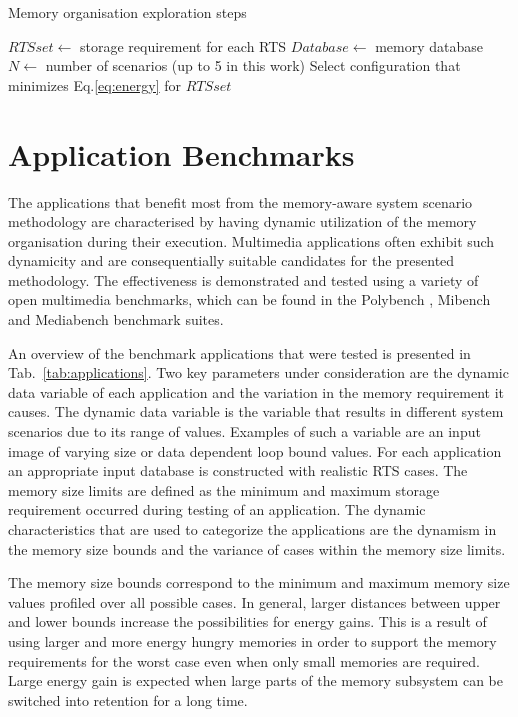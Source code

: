 \begin{algorithm}[!t]
\caption{Memory organisation exploration steps}
 \label{alg:clustering}
 \begin{algorithmic}[1]
		\STATE $RTSset \gets$ storage requirement for each RTS
		\STATE $Database \gets $ memory database
		\STATE $N \gets $ number of scenarios (up to 5 in this work)
				  \ENDIF
				\STATE Select configuration that minimizes Eq.\ref{eq:energy} for $RTSset$			
				\ENDFOR			
			\ENDFOR
 \end{algorithmic}
\end{algorithm}

 
\section{Application Benchmarks}
\label{sec:applicationsB}

The applications that benefit most from the memory-aware system scenario methodology are characterised by having dynamic utilization of the memory organisation during their execution. Multimedia applications often exhibit such dynamicity and are consequentially suitable candidates for the presented methodology. The effectiveness is demonstrated and tested using a variety of open multimedia benchmarks, which can be found in the Polybench \cite{Poly}, Mibench \cite{mibench} and Mediabench \cite{mediabench} benchmark suites. 

An overview of the benchmark applications that were tested is presented in Tab.~\ref{tab:applications}. Two key parameters under consideration are the dynamic data variable of each application and the variation in the memory requirement it causes. The dynamic data variable is the variable that results in different system scenarios due to its range of values. Examples of such a variable are an input image of varying size or data dependent loop bound values. For each application an appropriate input database is constructed with realistic RTS cases. The memory size limits are defined as the minimum and maximum storage requirement occurred during testing of an application. The dynamic characteristics that are used to categorize the applications are the dynamism in the memory size bounds and the variance of cases within the memory size limits.

The memory size bounds correspond to the minimum and maximum memory size values profiled over all possible cases. In general, larger distances between upper and lower bounds increase the possibilities for energy gains. This is a result of using larger and more energy hungry memories in order to support the memory requirements for the worst case even when only small memories are required. Large energy gain is expected when large parts of the memory subsystem can be switched into retention for a long time. 

